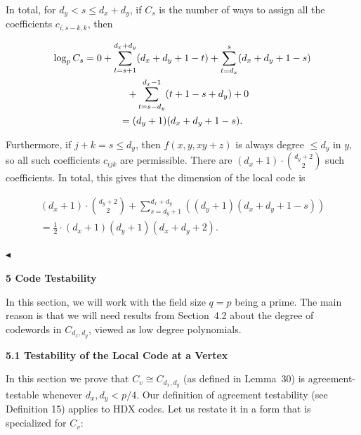 \documentclass[10pt,a4paper]{article}
\begin{document}
In total, for $d_{y}<s\leq d_{x}+d_{y}$, if $C_{s}$ is the number of ways to assign all the coefficients $c_{i,s-k,k}$, then\par


\[\begin{gathered}
\displaystyle\log_{p}C_{s} \displaystyle=0+\sum_{t=s+1}^{d_{x}+d_{y}}(d_{x}+d_{y}+1-t)+\sum_{t=d_{x}}^{s}(d_{x}+d_{y}+1-s) \\
\displaystyle\nobreak\ \nobreak\ \nobreak\ \nobreak\ +\sum_{t=s-d_{y}}^{d_{x}-1}(t+1-s+d_{y})+0 \\
\displaystyle=(d_{y}+1)(d_{x}+d_{y}+1-s).
\end{gathered}\]


Furthermore, if $j+k=s\leq d_{y}$, then $f(x,y,xy+z)$ is always degree $\leq d_{y}$ in $y$, so all such coefficients $c_{ijk}$ are permissible. There are $(d_{x}+1)\cdot\binom{d_{y}+2}{2}$ such coefficients. In total, this gives that the dimension of the local code is\par


\[\begin{gathered}
\displaystyle(d_{x}+1)\cdot\binom{d_{y}+2}{2}+\sum_{s=d_{y}+1}^{d_{x}+d_{y}}\left((d_{y}+1)(d_{x}+d_{y}+1-s)\right) \\
\displaystyle=\frac{1}{2}\cdot(d_{x}+1)(d_{y}+1)(d_{x}+d_{y}+2).
\end{gathered}\]


$\blacktriangleleft$\par







\par\medskip\noindent\textbf{
5 Code Testability}\par




In this section, we will work with the field size $q=p$ being a prime. The main reason is that we will need results from Section 4.2 about the degree of codewords in $C_{d_{x},d_{y}}$, viewed as low degree polynomials.\par




\par\medskip\noindent\textbf{
5.1 Testability of the Local Code at a Vertex}\par




In this section we prove that $C_{v}\cong C_{d_{x},d_{y}}$ (as defined in Lemma 30) is agreement-testable whenever $d_{x},d_{y}<p/4$. Our definition of agreement testability (see Definition 15) applies to HDX codes. Let us restate it in a form that is specialized for $C_{v}$:\par
\end{document}
